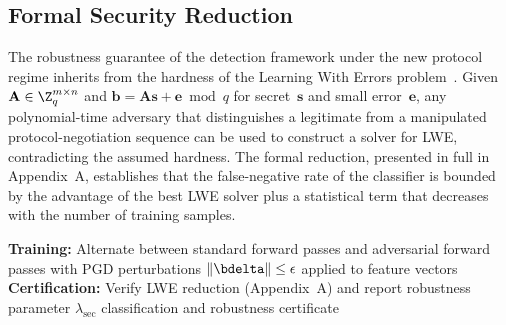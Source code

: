 \subsection{Formal Security Reduction}

The robustness guarantee of the detection framework under the new protocol regime inherits from the hardness of the Learning With Errors problem~\cite{Regev2009,Peikert2016}. Given $\mathbf{A}\in\Z_q^{m\times n}$ and $\mathbf{b}=\mathbf{A}\mathbf{s}+\mathbf{e}\bmod q$ for secret~$\mathbf{s}$ and small error~$\mathbf{e}$, any polynomial-time adversary that distinguishes a legitimate from a manipulated protocol-negotiation sequence can be used to construct a solver for LWE, contradicting the assumed hardness. The formal reduction, presented in full in Appendix~A, establishes that the false-negative rate of the classifier is bounded by the advantage of the best LWE solver plus a statistical term that decreases with the number of training samples.

\begin{algorithm}[htbp]
\caption{Forward-Compatible Multi-Protocol Detection}\label{alg:pqidps}
\textbf{Training:} Alternate between standard forward passes and adversarial forward passes with PGD perturbations $\|\bdelta\|\le\epsilon$ applied to feature vectors\;
\textbf{Certification:} Verify LWE reduction (Appendix~A) and report robustness parameter $\lambda_{\mathrm{sec}}$\;
\Return classification and robustness certificate
\end{algorithm}


